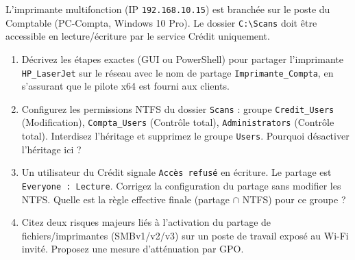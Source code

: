 \documentclass[11pt]{article}
\begin{document}
\begin{exercice}
L'imprimante multifonction (IP \texttt{192.168.10.15}) est branchée sur le poste du Comptable (PC-Compta, Windows 10 Pro). Le dossier \texttt{C:\textbackslash Scans} doit être accessible en lecture/écriture par le service Crédit uniquement.
\begin{enumerate}
    \item Décrivez les étapes exactes (GUI ou PowerShell) pour partager l'imprimante \texttt{HP\_LaserJet} sur le réseau avec le nom de partage \texttt{Imprimante\_Compta}, en s'assurant que le pilote x64 est fourni aux clients.
    \item Configurez les permissions NTFS du dossier \texttt{Scans} : groupe \texttt{Credit\_Users} (Modification), \texttt{Compta\_Users} (Contrôle total), \texttt{Administrators} (Contrôle total). Interdisez l'héritage et supprimez le groupe \texttt{Users}. Pourquoi désactiver l'héritage ici ?
    \item Un utilisateur du Crédit signale \texttt{Accès refusé} en écriture. Le partage est \texttt{Everyone : Lecture}. Corrigez la configuration du partage sans modifier les NTFS. Quelle est la règle effective finale (partage $\cap$ NTFS) pour ce groupe ?
    \item Citez deux risques majeurs liés à l'activation du partage de fichiers/imprimantes (SMBv1/v2/v3) sur un poste de travail exposé au Wi-Fi invité. Proposez une mesure d'atténuation par GPO.
\end{enumerate}
\end{exercice}
\end{document}
